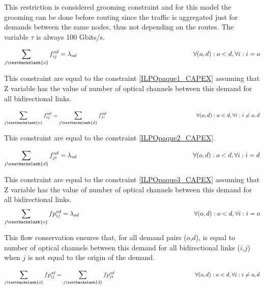 This restriction is considered grooming constraint and for this model the grooming can be done before routing since the traffic is aggregated just for demands between the same nodes, thus not depending on the routes. The variable  $\tau$ is always 100 Gbits/s.

\begin{equation}
\sum_{j\textbackslash \{o\}} f_{ij}^{od} = \lambda_{od} \qquad \qquad \qquad \qquad \qquad \qquad \qquad \qquad \qquad
\forall(o,d) : o < d, \forall i: i = o
\label{ILPTransp1}
\end{equation}

This constraint are equal to the constraint \ref{ILPOpaque1_CAPEX} assuming that Z variable has the value of number of optical channels between this demand for all bidirectional links.

\begin{equation}
\sum_{j\textbackslash \{o\}} f_{ij}^{od} = \sum_{j\textbackslash \{d\}} f_{ji}^{od} \qquad \qquad \qquad \qquad \qquad \qquad \qquad \qquad
\forall(o,d) : o < d, \forall i: i \neq o,d
\label{ILPTransp2}
\end{equation}

This constraint are equal to the constraint \ref{ILPOpaque2_CAPEX}.

\begin{equation}
\sum_{j\textbackslash \{d\}} f_{ji}^{od} = \lambda_{od}  \qquad \qquad \qquad \qquad \qquad \qquad \qquad \qquad \qquad
\forall(o,d) : o < d, \forall i: i = d
\label{ILPTransp3}
\end{equation}

This constraint are equal to the constraint \ref{ILPOpaque3_CAPEX} assuming that Z variable has the value of number of optical channels between this demand for all bidirectional links.
\newpage
\begin{equation}
\sum_{j\textbackslash \{o\}} fp_{ij}^{od} = \lambda_{od} \qquad \qquad \qquad \qquad \qquad \qquad \qquad \qquad \qquad
\forall(o,d) : o < d, \forall i: i = o
\label{ILPTransp1p}
\end{equation}

This flow conservation ensures that, for all demand pairs ($o$,$d$), is equal to number of optical channels between this demand for all bidirectional links ($i$,$j$) when $j$ is not equal to the origin of the demand.

\begin{equation}
\sum_{j\textbackslash \{o\}} fp_{ij}^{od} = \sum_{j\textbackslash \{d\}} fp_{ji}^{od} \qquad \qquad \qquad \qquad \qquad \qquad \qquad
\forall(o,d) : o < d, \forall i: i \neq o,d
\label{ILPTransp2p}
\end{equation}

